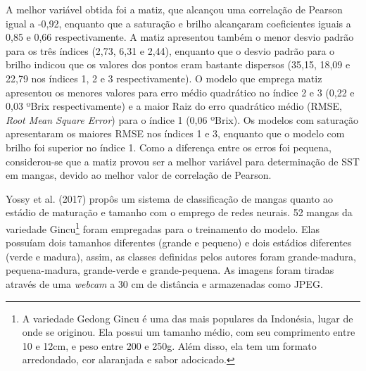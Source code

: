 A melhor variável obtida foi a matiz, que alcançou uma correlação de Pearson igual a -0,92, enquanto que a saturação e brilho alcançaram coeficientes iguais a 0,85 e 0,66 respectivamente. A matiz apresentou também o menor desvio padrão para os três índices (2,73, 6,31 e 2,44), enquanto que o desvio padrão para o brilho indicou que os valores dos pontos eram bastante dispersos (35,15, 18,09 e 22,79 nos índices 1, 2 e 3 respectivamente). O modelo que emprega matiz apresentou os menores valores para erro médio quadrático no índice 2 e 3 (0,22 e 0,03 ºBrix respectivamente) e a maior Raiz do erro quadrático médio (RMSE, \textit{Root Mean Square Error}) para o índice 1 (0,06 ºBrix). Os modelos com saturação apresentaram os maiores RMSE nos índices 1 e 3, enquanto que o modelo com brilho foi superior no índice 1. Como a diferença entre os erros foi pequena, considerou-se que a matiz provou ser a melhor variável para determinação de SST em mangas, devido ao melhor valor de correlação de Pearson. 

Yossy et al. (2017) propôs um sistema de classificação de mangas quanto ao estádio de maturação e tamanho com o emprego de redes neurais. 52 mangas da variedade Gincu\footnote{\label{ftnote:gincu}A variedade Gedong Gincu é uma das mais populares da Indonésia, lugar de onde se originou. Ela possui um tamanho médio, com seu comprimento entre 10 e 12cm, e peso entre 200 e 250g. Além disso, ela tem um formato arredondado, cor alaranjada e sabor adocicado.} foram empregadas para o treinamento do modelo. Elas possuíam dois tamanhos diferentes (grande e pequeno) e dois estádios diferentes (verde e madura), assim, as classes definidas pelos autores foram grande-madura, pequena-madura, grande-verde e grande-pequena. As imagens foram tiradas através de uma \textit{webcam} a 30 cm de distância e armazenadas como JPEG.


